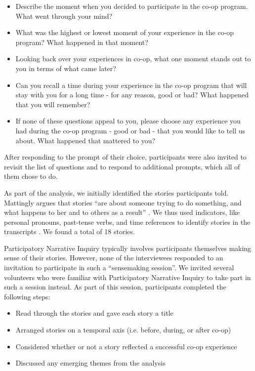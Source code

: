 \documentclass{article}
\begin{document}
\begin{itemize}
    \item Describe the moment when you decided to participate in the co-op program. What went through your mind?
    \item What was the highest or lowest moment of your experience in the co-op program? What happened in that moment?
    \item Looking back over your experiences in co-op, what one moment stands out to you in terms of what came later?
    \item Can you recall a time during your experience in the co-op program that will stay with you for a long time - for any reason, good or bad? What happened that you will remember?
    \item If none of these questions appeal to you, please choose any experience you had during the co-op program - good or bad - that you would like to tell us about. What happened that mattered to you?
\end{itemize}

After responding to the prompt of their choice, participants were also invited to revisit the list of questions and to respond to additional prompts, which all of them chose to do.

As part of the analysis, we initially identified the stories participants told. Mattingly argues that stories “are about someone trying to do something, and what happens to her and to others as a result” \cite{mattinglyHealingDramasClinical1998}. We thus used indicators, like personal pronouns, past-tense verbs, and time references to identify stories in the transcripts \cite{kurtzWorkingStoriesYour2014}. We found a total of 18 stories.

Participatory Narrative Inquiry typically involves participants themselves making sense of their stories. However, none of the interviewees responded to an invitation to participate in such a “sensemaking session”. We invited several volunteers who were familiar with Participatory Narrative Inquiry to take part in such a session instead. As part of this session, participants completed the following steps:

\begin{itemize}
    \item Read through the stories and gave each story a title
    \item Arranged stories on a temporal axis (i.e. before, during, or after co-op)
    \item Considered whether or not a story reflected a successful co-op experience
    \item Discussed any emerging themes from the analysis
\end{itemize}
\end{document}
